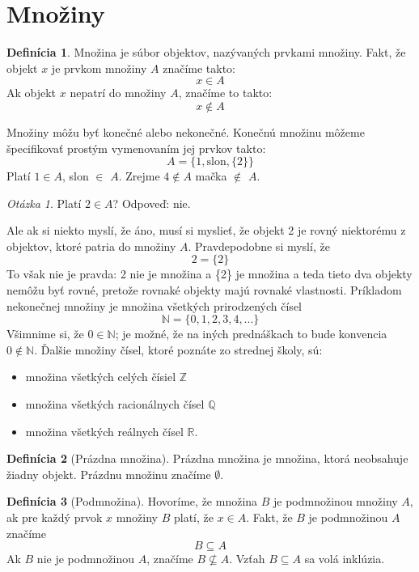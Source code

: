 \documentclass[12pt, a4paper]{article}
\theoremstyle{definition}
\newtheorem{definition}{Definícia}[section]
\theoremstyle{plain}
\theoremstyle{remark}
\newtheorem*{question}{Otázka}
\begin{document}
\section{Množiny}

\begin{definition}
Množina je súbor objektov, nazývaných prvkami množiny.
Fakt, že objekt $x$ je prvkom množiny $A$ značíme takto:
$$x \in A$$
Ak objekt $x$ nepatrí do množiny $A$, značíme to takto:
$$x \notin A$$
\end{definition}

Množiny môžu byť konečné alebo nekonečné.
Konečnú množinu môžeme špecifikovať prostým vymenovaním jej prvkov takto:
$$A = \{1, \text{slon}, \{2\}\}$$
Platí $1 \in A$, slon $\in$ $A$. Zrejme $4 \notin A$ mačka $\notin$ $A$.

\begin{question}
Platí $2 \in A$?
Odpoveď: nie.
\end{question}

Ale ak si niekto myslí, že áno, musí si myslieť, že objekt 2 je rovný niektorému z objektov, ktoré patria do množiny $A$. Pravdepodobne si myslí, že
$$2 = \{2\}$$
To však nie je pravda: 2 nie je množina a \{2\} je množina a teda tieto dva objekty nemôžu byť rovné, pretože rovnaké objekty majú rovnaké vlastnosti.
Príkladom nekonečnej množiny je množina všetkých prirodzených čísel
$$\mathbb{N}=\{0,1,2,3,4,...\}$$
Všimnime si, že $0 \in \mathbb{N}$;
je možné, že na iných prednáškach to bude konvencia $0 \notin \mathbb{N}$.
Ďalšie množiny čísel, ktoré poznáte zo strednej školy, sú:
\begin{itemize}
    \item množina všetkých celých čísiel $\mathbb{Z}$
    \item množina všetkých racionálnych čísel $\mathbb{Q}$
    \item množina všetkých reálnych čísel $\mathbb{R}$.
\end{itemize}

\begin{definition}[Prázdna množina]
Prázdna množina je množina, ktorá neobsahuje žiadny objekt. Prázdnu množinu značíme $\emptyset$.
\end{definition}

\begin{definition}[Podmnožina]
Hovoríme, že množina $B$ je podmnožinou množiny $A$, ak pre každý prvok $x$ množiny $B$ platí, že $x \in A$.
Fakt, že $B$ je podmnožinou $A$ značíme
$$B \subseteq A$$
Ak $B$ nie je podmnožinou $A$, značíme $B \not\subseteq A$.
Vzťah $B \subseteq A$ sa volá inklúzia.
\end{definition}
\end{document}
